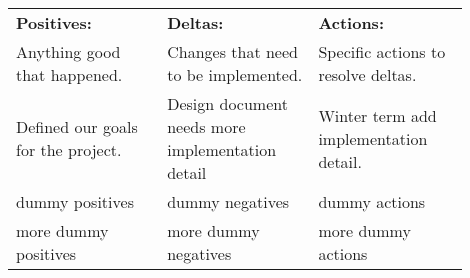 \documentclass[compsoc,draftclsnofoot,onecolumn,10pt]{IEEEtran}
\begin{document}
	\begin{center}
		\begin{tabular}{|p{0.3\linewidth}|p{0.3\linewidth}|p{0.3\linewidth}|}
			\hline
			\textbf{Positives:} & \textbf{Deltas:} & \textbf{Actions:}\\
			
            Anything good that happened. & Changes that need to be implemented. & Specific actions to resolve deltas.\\
			\hline

			Defined our goals for the project. & Design document needs more implementation detail & Winter term add implementation detail.\\
			\hline
            
			dummy positives & dummy negatives & dummy actions\\
			\hline

			more dummy positives & more dummy negatives & more dummy actions\\
			\hline
			
		\end{tabular}
	\end{center}
\end{document}
